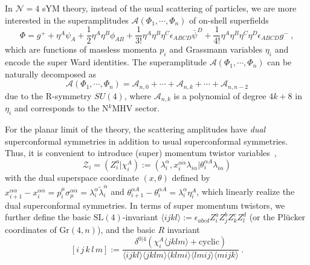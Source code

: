 \documentclass[a4paper,12pt]{article}
\begin{document}
In $\mathcal{N}=4$ sYM theory, instead of the usual scattering of particles, we are more interested in the superamplitudes $\mathcal{A}(\Phi_{1},\cdots,\Phi_{n})$ of on-shell superfields
\[
\Phi=g^{+} +\eta^{A}\psi_{A}+\frac{1}{2}\eta^{A}\eta^{B}\phi_{AB} + \frac{1}{3!}\eta^{A}\eta^{B}\eta^{C}\epsilon_{ABCD}\bar{\psi}^{D}
+ \frac{1}{4!}\eta^{A}\eta^{B}\eta^{C}\eta^{D}\epsilon_{ABCD}g^{-}\:,
\]
which are functions of massless momenta $p_{i}$ and Grassmann variables $\eta_{i}$ and encode the super Ward identities. The superamplitude $\mathcal{A}(\Phi_{1},\cdots,\Phi_{n})$ can be naturally decomposed as 
\begin{equation}
    \mathcal{A}(\Phi_{1},\cdots,\Phi_{n})=\mathcal{A}_{n,0}+\cdots+\mathcal{A}_{n,k}+\cdots+\mathcal{A}_{n,n-2}
\end{equation}
due to the R-symmetry $SU(4)$, where $\mathcal{A}_{n,k}$ is a polynomial of degree $4k{+}8$ in $\eta_{i}$ and corresponds to the N$^{k}$MHV sector.

For the planar limit of the theory, the scattering amplitudes have \emph{dual} superconformal symmetries in addition to  usual superconformal symmetries.
Thus, it is convenient to introduce (super) momentum twistor variables~\cite{Hodges:2009hk},
\begin{equation}
    \mathcal{Z}_{i}=(Z_{i}^{a}\vert\chi_{i}^{A}):=(\lambda_{i}^{\alpha},x_{i}^{\alpha\dot{\alpha}}\lambda_{i\alpha}\vert \theta_{i}^{\alpha A}\lambda_{i \alpha})
\end{equation}
with the dual superspace coordinate $(x,\theta)$ defined by $x_{i+1}^{\alpha\dot{\alpha}}-x_{i}^{\alpha\dot{\alpha}}=p_{i}^{\mu}\sigma_{\mu}^{\alpha\dot{\alpha}}=\lambda_{i}^{\alpha}\tilde{\lambda}_{i}^{\dot{\alpha}}$ and $\theta_{i+1}^{\alpha A}-\theta_{i}^{\alpha A}=\lambda_{i}^{\alpha}\eta_{i}^{A}$, which linearly realize the dual superconformal symmetries. In terms of super momentum twistors, we further define the basic $\mathrm{SL}(4)$-invariant $\langle ijkl\rangle:=\epsilon_{abcd}Z_{i}^{a}Z_{j}^{b}Z_{k}^{c}Z_{l}^{d}$ (or the Pl\"{u}cker coordinates of $\mathrm{Gr}(4,n)$), and the basic $R$ invariant~\cite{Drummond:2008vq,Mason:2009qx}
\begin{equation}\label{Rinv}
    [i\,j\,k\,l\,m]:=\frac{\delta^{0\vert 4}(\chi_{i}^{A}\langle jklm\rangle+\text{cyclic})}{\langle ijkl\rangle\langle jklm\rangle
    \langle klmi\rangle\langle lmij\rangle\langle mijk\rangle} \:.
\end{equation}
\end{document}
